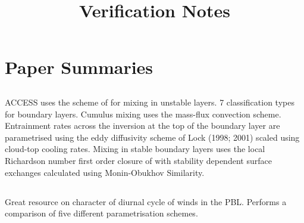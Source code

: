\documentclass{article}
\title{Verification Notes}
\begin{document}
\maketitle

\section{Paper Summaries}

\subsection{\citet{bom10}}
ACCESS uses the scheme of \citet{lock00} for mixing in unstable layers. 7 classification types for boundary layers. Cumulus mixing uses the mass-flux convection scheme. Entrainment rates across the inversion at the top of the boundary layer are parametrised using the eddy diffusivity scheme of Lock (1998; 2001) scaled using cloud-top cooling rates. Mixing in stable boundary layers uses the local Richardson number first order closure of \citet{louis79} with stability dependent surface exchanges calculated using Monin-Obukhov Similarity. 

\subsection{\citet{louis79}}

\subsection{\citet{lock00}}

\subsection{\citet{ecmwf18}}

\subsection{\citet{bishop13}}

\subsection{\citet{basu08}}

\subsection{\citet{kumar06}}

\subsection{\citet{zhang04}}
Great resource on character of diurnal cycle of winds in the PBL. Performs a comparison of five different parametrisation schemes. 
\end{document}
